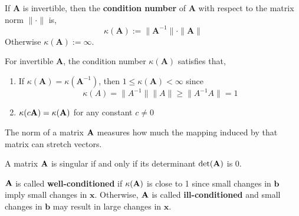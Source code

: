 \begin{defn}
    \sloppy If $\mathbf{A}$ is invertible, then the \textbf{condition number} of $\mathbf{A}$ with respect to the matrix norm $\|\cdot\|$ is,
    \[\kappa(\mathbf{A}):=\|\mathbf{A}^{-1}\| \cdot \|\mathbf{A}\|\]
    Otherwise $\kappa(\mathbf{A}):= \infty$.
\end{defn}

\begin{rmk}
    For invertible $\mathbf{A}$, the condition number $\kappa(\mathbf{A})$ satisfies that,
    \begin{enumerate}
        \item If $\kappa(\mathbf{A}) = \kappa(\mathbf{A}^{-1}) $, then $1 \leq \kappa(\mathbf{A}) < \infty$ since
        \[\kappa(A)=\|A^{-1}\|\|A\| \geq\|A^{-1} A\|=1\]
        \item $\kappa(c\mathbf{A}) = \kappa(\mathbf{A})$ for any constant $c \neq 0$
    \end{enumerate}
\end{rmk}

\begin{marginfigure}
    The norm of a matrix $\mathbf{A}$ measures how much the mapping induced by that matrix can stretch vectors.
\end{marginfigure}


\begin{marginfigure}
    A matrix $\mathbf{A}$ is singular if and only if its determinant $\text{det}(\mathbf{A})$ is 0.
\end{marginfigure}

\noindent $\mathbf{A}$ is called \textbf{well-conditioned} if $\kappa(\mathbf{A})$ is close to 1 since small changes in $\mathbf{b}$ imply small changes in $\mathbf{x}$. Otherwise, $\mathbf{A}$ is called \textbf{ill-conditioned} and small changes in $\mathbf{b}$ may result in large changes in $\mathbf{x}$.

